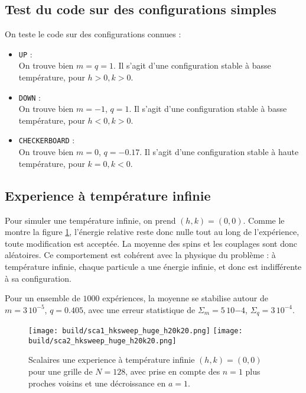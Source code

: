 \documentclass[a4paper, 11pt]{article}
\begin{document}
\subsection{Test du code sur des configurations simples}

On teste le code sur des configurations connues :
\begin{itemize}
    \item \texttt{UP} : \\
        On trouve bien $m = q = 1$. Il s'agit d'une configuration stable à basse température, pour
        $h>0, k>0$.
    \item \texttt{DOWN} : \\
        On trouve bien $m = -1$, $q = 1$. Il s'agit d'une configuration stable à basse température,
        pour $h<0, k>0$.
    \item \texttt{CHECKERBOARD} : \\
        On trouve bien $m = 0$, $q = -0.17$. Il s'agit d'une configuration stable à haute
        température, pour $k=0, k<0$.
\end{itemize}

\subsection{Experience à température infinie}

Pour simuler une température infinie, on prend $(h, k) = (0, 0)$. Comme le montre la figure
\ref{fig:inf_en_sca}, l'énergie relative reste donc nulle tout au long de l'expérience, toute
modification est acceptée. La moyenne des spins et les couplages sont donc aléatoires. Ce
comportement est cohérent avec la physique du problème : à température infinie, chaque particule a
une énergie infinie, et donc est indifférente à sa configuration.

Pour un ensemble de $1000$ expériences, la moyenne se stabilise autour de $m=3\,10^{-5}$, $q=0.405$, avec une erreur
statistique de $\Sigma_m = 5\,10{-4}$, $\Sigma_q = 3\,10^{-4}$. 

\begin{figure}
    \centering
    \texttt{[image: build/sca1\_hksweep\_huge\_h20k20.png]}
    \texttt{[image: build/sca2\_hksweep\_huge\_h20k20.png]}
    \caption{Scalaires une experience à température infinie $(h, k) = (0, 0)$ pour une grille de
    $N=128$, avec prise en compte des $n=1$ plus proches voisins et une décroissance en $a=1$.}
    \label{fig:inf_en_sca}
\end{figure}
\end{document}
